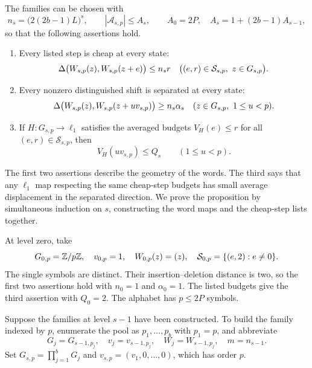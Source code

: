 \begin{proposition}\label{prop:family}
The families can be chosen with
\[
 n_s=\bigl(2(2b-1)L\bigr)^s,\qquad
 |\mathcal A_{s,p}|\le A_s,\qquad
 A_0=2P,\quad A_s=1+(2b-1)A_{s-1},
\]
so that the following assertions hold.
\begin{enumerate}
\item Every listed step is cheap at every state:
\begin{equation}\label{eq:step-property}
 \Delta\bigl(W_{s,p}(z),W_{s,p}(z+e)\bigr)\le n_s r
 \quad\bigl((e,r)\in\mathcal S_{s,p},\ z\in G_{s,p}\bigr).
\end{equation}
\item Every nonzero distinguished shift is separated at every state:
\begin{equation}\label{eq:far-property}
 \Delta\bigl(W_{s,p}(z),W_{s,p}(z+uv_{s,p})\bigr)\ge n_s\alpha_s
 \quad(z\in G_{s,p},\ 1\le u<p).
\end{equation}
\item If $H:G_{s,p}\to\ell_1$ satisfies the averaged budgets
$V_H(e)\le r$ for all $(e,r)\in\mathcal S_{s,p}$, then
\begin{equation}\label{eq:l1-property}
 V_H(uv_{s,p})\le Q_s\qquad(1\le u<p).
\end{equation}
\end{enumerate}
\end{proposition}

The first two assertions describe the geometry of the words. The third
says that any $\ell_1$ map respecting the same cheap-step budgets has
small average displacement in the separated direction. We prove the
proposition by simultaneous induction on $s$, constructing the word maps
and the cheap-step lists together.

At level zero, take
\[
 G_{0,p}=\mathbb Z/p\mathbb Z,\quad v_{0,p}=1,\quad
 W_{0,p}(z)=(z),\quad
 \mathcal S_{0,p}=\{(e,2):e\ne0\}.
\]
The single symbols are distinct. Their insertion--deletion distance is
two, so the first two assertions hold with $n_0=1$ and $\alpha_0=1$.
The listed budgets give the third assertion with $Q_0=2$.
The alphabet has $p\le2P$ symbols.

Suppose the families at level $s-1$ have been constructed. To build
the family indexed by $p$, enumerate the pool as $p_1,\ldots,p_b$ with
$p_1=p$, and abbreviate
\[
 G_j=G_{s-1,p_j},\quad v_j=v_{s-1,p_j},\quad
 W_j=W_{s-1,p_j},\quad m=n_{s-1}.
\]
Set
$G_{s,p}=\prod_{j=1}^bG_j$ and
$v_{s,p}=(v_1,0,\ldots,0)$, which has order $p$.


